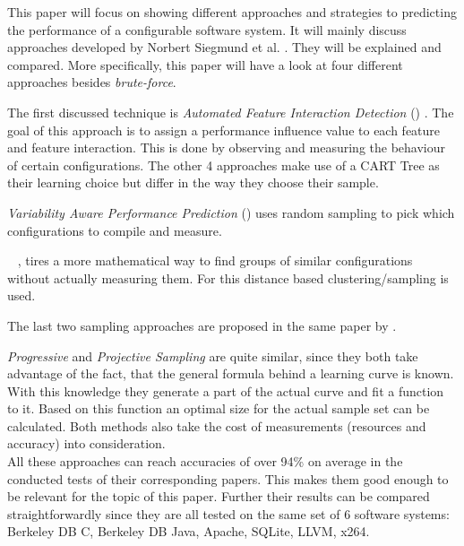 \newpage\noindent
This paper will focus on showing different approaches and strategies to predicting the performance of a configurable software system. It will mainly discuss approaches developed by Norbert Siegmund et al. \cite{AutomatedFeatureDetectionSiegmund2012,VariabilityAwarePerformancePredictionJianmeiSigmundApel, CostEfficientSampling_Gou_Siegmund_2015, DistanceBasedSampling2019}. They will be explained and compared. More specifically, this paper will have a look at four different approaches besides \textit{brute-force}.

The first discussed technique is \textit{Automated Feature Interaction Detection} (\AFID) \cite{AutomatedFeatureDetectionSiegmund2012}. The goal of this approach is to assign a performance influence value to each feature and feature interaction. This is done by observing and measuring the behaviour of certain configurations. 
The other 4 approaches make use of a CART Tree as their learning choice but differ in the way they choose their sample.
 
\textit{Variability Aware Performance Prediction} (\VAPP) \cite{VariabilityAwarePerformancePredictionJianmeiSigmundApel} uses random sampling to pick which configurations to compile and measure. 

\WHAT~ \cite{DistanceBasedSampling2019}, tires a more mathematical way to find groups of similar configurations without actually measuring them. For this distance based clustering/sampling is used. 

The last two sampling approaches are proposed in the same paper by \citet{CostEfficientSampling_Gou_Siegmund_2015}. 

\textit{Progressive} and \textit{Projective Sampling} are quite similar, since they both take advantage of the fact, that the general formula behind a learning curve is known. With this knowledge they generate a part of the actual curve and fit a function to it. Based on this function an optimal size for the actual sample set can be calculated. Both methods also take the cost of measurements (resources and accuracy) into consideration.\\
All these approaches can reach accuracies of over 94\% on average in the conducted tests of their corresponding papers. This makes them good enough to be relevant for the topic of this paper. Further their results can be compared straightforwardly since they are all tested on the same set of 6 software systems: Berkeley DB C, Berkeley DB Java, Apache, SQLite, LLVM, x264.